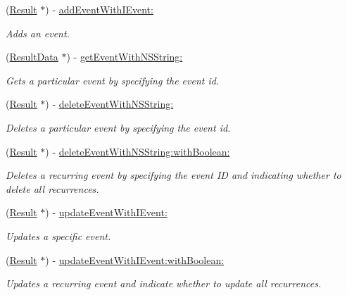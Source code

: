 \begin{DoxyCompactItemize}
\item 
(\hyperlink{interface_result}{Result} $\ast$) -\/ \hyperlink{protocol_i_events_engine-p_abb5075585ce0d2be532bf1ae8d2462f2}{add\+Event\+With\+I\+Event\+:}
\begin{DoxyCompactList}\small\item\em Adds an event. \end{DoxyCompactList}\item 
(\hyperlink{interface_result_data}{Result\+Data} $\ast$) -\/ \hyperlink{protocol_i_events_engine-p_a3ef53935809a476191d5b30405ff8e24}{get\+Event\+With\+N\+S\+String\+:}
\begin{DoxyCompactList}\small\item\em Gets a particular event by specifying the event id. \end{DoxyCompactList}\item 
(\hyperlink{interface_result}{Result} $\ast$) -\/ \hyperlink{protocol_i_events_engine-p_a27dce5eb64c31afd30384822f6706795}{delete\+Event\+With\+N\+S\+String\+:}
\begin{DoxyCompactList}\small\item\em Deletes a particular event by specifying the event id. \end{DoxyCompactList}\item 
(\hyperlink{interface_result}{Result} $\ast$) -\/ \hyperlink{protocol_i_events_engine-p_a1c4de0fcbd9dbc9f8fe1e965086fad14}{delete\+Event\+With\+N\+S\+String\+:with\+Boolean\+:}
\begin{DoxyCompactList}\small\item\em Deletes a recurring event by specifying the event I\+D and indicating whether to delete all recurrences. \end{DoxyCompactList}\item 
(\hyperlink{interface_result}{Result} $\ast$) -\/ \hyperlink{protocol_i_events_engine-p_aa9eff5fd905ea2eb2cdf4bc2ec65e414}{update\+Event\+With\+I\+Event\+:}
\begin{DoxyCompactList}\small\item\em Updates a specific event. \end{DoxyCompactList}\item 
(\hyperlink{interface_result}{Result} $\ast$) -\/ \hyperlink{protocol_i_events_engine-p_a9e0a872ba71bf11b57e1b2839941e13d}{update\+Event\+With\+I\+Event\+:with\+Boolean\+:}
\begin{DoxyCompactList}\small\item\em Updates a recurring event and indicate whether to update all recurrences. \end{DoxyCompactList}\item 

\end{DoxyCompactItemize}
